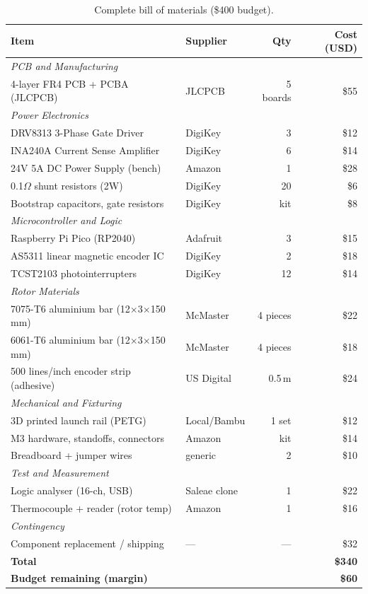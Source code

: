 \documentclass[12pt,letterpaper]{article}
\begin{document}
\begin{table}[H]
\centering
\caption{Complete bill of materials (\$400 budget).}
\label{tab:bom}
\begin{tabularx}{\textwidth}{Xlrr}
\toprule
\textbf{Item} & \textbf{Supplier} & \textbf{Qty} & \textbf{Cost (USD)} \\
\midrule
\multicolumn{4}{l}{\textit{PCB and Manufacturing}} \\
4-layer FR4 PCB + PCBA (JLCPCB) & JLCPCB & 5 boards & \$55 \\
\midrule
\multicolumn{4}{l}{\textit{Power Electronics}} \\
DRV8313 3-Phase Gate Driver & DigiKey & 3 & \$12 \\
INA240A Current Sense Amplifier & DigiKey & 6 & \$14 \\
24V 5A DC Power Supply (bench) & Amazon & 1 & \$28 \\
0.1$\Omega$ shunt resistors (2W) & DigiKey & 20 & \$6 \\
Bootstrap capacitors, gate resistors & DigiKey & kit & \$8 \\
\midrule
\multicolumn{4}{l}{\textit{Microcontroller and Logic}} \\
Raspberry Pi Pico (RP2040) & Adafruit & 3 & \$15 \\
AS5311 linear magnetic encoder IC & DigiKey & 2 & \$18 \\
TCST2103 photointerrupters & DigiKey & 12 & \$14 \\
\midrule
\multicolumn{4}{l}{\textit{Rotor Materials}} \\
7075-T6 aluminium bar (12$\times$3$\times$150\,mm) & McMaster & 4 pieces & \$22 \\
6061-T6 aluminium bar (12$\times$3$\times$150\,mm) & McMaster & 4 pieces & \$18 \\
500 lines/inch encoder strip (adhesive) & US Digital & 0.5\,m & \$24 \\
\midrule
\multicolumn{4}{l}{\textit{Mechanical and Fixturing}} \\
3D printed launch rail (PETG) & Local/Bambu & 1 set & \$12 \\
M3 hardware, standoffs, connectors & Amazon & kit & \$14 \\
Breadboard + jumper wires & generic & 2 & \$10 \\
\midrule
\multicolumn{4}{l}{\textit{Test and Measurement}} \\
Logic analyser (16-ch, USB) & Saleae clone & 1 & \$22 \\
Thermocouple + reader (rotor temp) & Amazon & 1 & \$16 \\
\midrule
\multicolumn{4}{l}{\textit{Contingency}} \\
Component replacement / shipping & — & — & \$32 \\
\midrule
\textbf{Total} & & & \textbf{\$340} \\
\textbf{Budget remaining (margin)} & & & \textbf{\$60} \\
\bottomrule
\end{tabularx}
\end{table}
\end{document}
